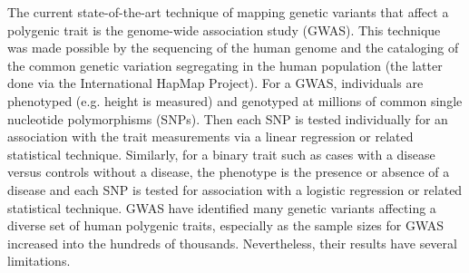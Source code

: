 The current state-of-the-art technique of mapping genetic variants
that affect a polygenic trait is the genome-wide association study
(GWAS). This technique was made possible by the sequencing of the
human genome and the cataloging of the common genetic variation
segregating in the human population (the latter done via the
International HapMap Project). For a GWAS, individuals are phenotyped
(e.g. height is measured) and genotyped at millions of common single
nucleotide polymorphisms (SNPs).  Then each SNP is tested individually
for an association with the trait measurements via a linear regression
or related statistical technique. Similarly, for a binary trait such
as cases with a disease versus controls without a disease, the
phenotype is the presence or absence of a disease and each SNP is
tested for association with a logistic regression or related
statistical technique. GWAS have identified many genetic variants
affecting a diverse set of human polygenic traits, especially as the
sample sizes for GWAS increased into the hundreds of
thousands. Nevertheless, their results have several limitations.

